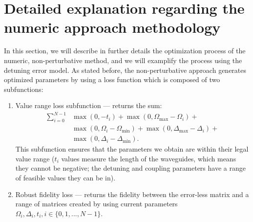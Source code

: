 \documentclass[floatfix,reprint, amsmath,amssymb,aps,superscriptaddress,nofootinbib]{revtex4-2}
\begin{document}
\section{Detailed explanation regarding the numeric approach methodology\label{appendix: numeric}}
In this section, we will describe in further details the optimization process of the numeric, non-perturbative method, and we will examplify the process using the detuning error model. As stated before, the non-perturbative approach generates optimized parameters by using a loss function which is composed of two subfunctions:
\begin{enumerate}
  \item Value range loss subfunction --- returns the sum:
  \begin{equation}
  \begin{split}
      \sum^{N-1}_{i=0} & \max(0,-t_i) +\max(0,\Omega_{\max} - \Omega_i) + \\ 
      & \max(0,\Omega_i - \Omega_{\min}) +
      \max(0,\Delta_{\max} - \Delta_i) + \\
      & \max(0, \Delta_i - \Delta_{\min} ) .
  \end{split}
  \end{equation}
  This subfunction ensures that the parameters we obtain are within their legal value range ($t_i$ values measure the length of the waveguides, which means they cannot be negative; the detuning and coupling parameters have a range of feasible values they can be in).
  \item  Robust fidelity loss --- returns the fidelity between the error-less matrix and a range of matrices created by using current parameters $\Omega_i,\Delta_i,t_i, i \in \{0,1,...,N-1\}$.
\end{enumerate}
\end{document}
